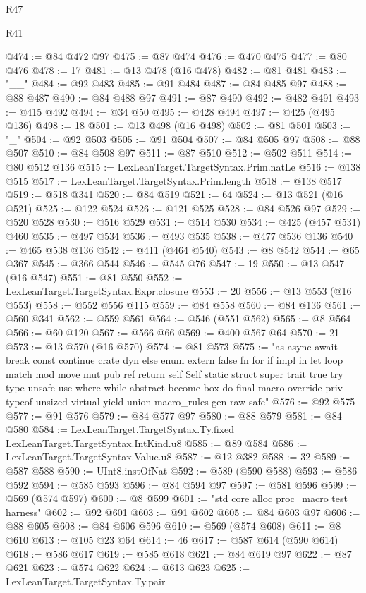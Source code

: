 \begin{lexlean}{R47}
\begin{lexlean}{R41}
\begin{coremodule}
{{{{{{{{{{{{{{{{{{{{{{{{{{{{{{{{{{{{{{{{{{{{{{{{{{{{{{{{{{{{{{{{{{{{{{{{{{{{{{{{{{{{{{{@474 := @84 @472 @97
@475 := @87 @474
@476 := @470 @475
@477 := @80 @476
@478 := 17
@481 := @13 @478 (@16 @478)
@482 := @81 @481
@483 := "__"
@484 := @92 @483
@485 := @91 @484
@487 := @84 @485 @97
@488 := @88 @487
@490 := @84 @488 @97
@491 := @87 @490
@492 := @482 @491
@493 := @415 @492
@494 := @34 @50
@495 := @428 @494
@497 := @425 (@495 @136)
@498 := 18
@501 := @13 @498 (@16 @498)
@502 := @81 @501
@503 := "_"
@504 := @92 @503
@505 := @91 @504
@507 := @84 @505 @97
@508 := @88 @507
@510 := @84 @508 @97
@511 := @87 @510
@512 := @502 @511
@514 := @80 @512 @136
@515 := LexLeanTarget.TargetSyntax.Prim.natLe
@516 := @138 @515
@517 := LexLeanTarget.TargetSyntax.Prim.length
@518 := @138 @517
@519 := @518 @341
@520 := @84 @519
@521 := 64
@524 := @13 @521 (@16 @521)
@525 := @122 @524
@526 := @121 @525
@528 := @84 @526 @97
@529 := @520 @528
@530 := @516 @529
@531 := @514 @530
@534 := @425 (@457 @531) @460
@535 := @497 @534
@536 := @493 @535
@538 := @477 @536 @136
@540 := @465 @538 @136
@542 := @411 (@464 @540)
@543 := @8 @542
@544 := @65 @367
@545 := @366 @544
@546 := @545 @76
@547 := 19
@550 := @13 @547 (@16 @547)
@551 := @81 @550
@552 := LexLeanTarget.TargetSyntax.Expr.closure
@553 := 20
@556 := @13 @553 (@16 @553)
@558 := @552 @556 @115
@559 := @84 @558
@560 := @84 @136
@561 := @560 @341
@562 := @559 @561
@564 := @546 (@551 @562)
@565 := @8 @564
@566 := @60 @120
@567 := @566 @66
@569 := @400 @567 @64
@570 := 21
@573 := @13 @570 (@16 @570)
@574 := @81 @573
@575 := "as async await break const continue crate dyn else enum extern false fn for if impl in let loop match mod move mut pub ref return self Self static struct super trait true try type unsafe use where while abstract become box do final macro override priv typeof unsized virtual yield union macro_rules gen raw safe"
@576 := @92 @575
@577 := @91 @576
@579 := @84 @577 @97
@580 := @88 @579
@581 := @84 @580
@584 := LexLeanTarget.TargetSyntax.Ty.fixed LexLeanTarget.TargetSyntax.IntKind.u8
@585 := @89 @584
@586 := LexLeanTarget.TargetSyntax.Value.u8
@587 := @12 @382
@588 := 32
@589 := @587 @588
@590 := UInt8.instOfNat
@592 := @589 (@590 @588)
@593 := @586 @592
@594 := @585 @593
@596 := @84 @594 @97
@597 := @581 @596
@599 := @569 (@574 @597)
@600 := @8 @599
@601 := "std core alloc proc_macro test harness"
@602 := @92 @601
@603 := @91 @602
@605 := @84 @603 @97
@606 := @88 @605
@608 := @84 @606 @596
@610 := @569 (@574 @608)
@611 := @8 @610
@613 := @105 @23 @64
@614 := 46
@617 := @587 @614 (@590 @614)
@618 := @586 @617
@619 := @585 @618
@621 := @84 @619 @97
@622 := @87 @621
@623 := @574 @622
@624 := @613 @623
@625 := LexLeanTarget.TargetSyntax.Ty.pair
}}}}}}}}}}}}}}}}}}}}}}}}}}}}}}}}}}}}}}}}}}}}}}}}}}}}}}}}}}}}}}}}}}}}}}}}}}}}}}}}}}}}}}}
\end{coremodule}
\end{lexlean}
\end{lexlean}
